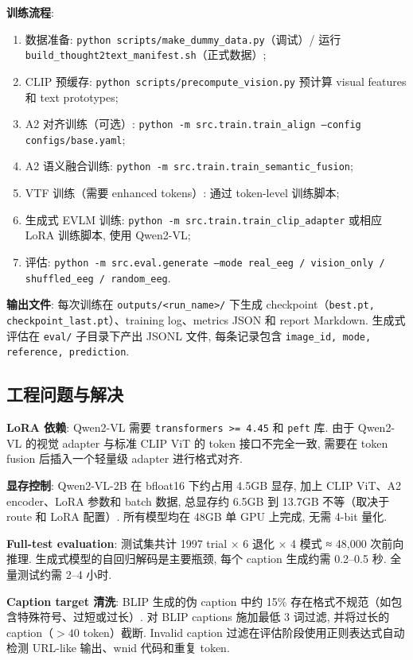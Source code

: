 \textbf{训练流程}:

\begin{enumerate}
  \item 数据准备: \texttt{python scripts/make\_dummy\_data.py}（调试）/ 运行 \texttt{build\_thought2text\_manifest.sh}（正式数据）;
  \item CLIP 预缓存: \texttt{python scripts/precompute\_vision.py} 预计算 visual features 和 text prototypes;
  \item A2 对齐训练（可选）: \texttt{python -m src.train.train\_align --config configs/base.yaml};
  \item A2 语义融合训练: \texttt{python -m src.train.train\_semantic\_fusion};
  \item VTF 训练（需要 enhanced tokens）: 通过 token-level 训练脚本;
  \item 生成式 EVLM 训练: \texttt{python -m src.train.train\_clip\_adapter} 或相应 LoRA 训练脚本, 使用 Qwen2-VL;
  \item 评估: \texttt{python -m src.eval.generate --mode real\_eeg / vision\_only / shuffled\_eeg / random\_eeg}.
\end{enumerate}

\textbf{输出文件}: 每次训练在 \texttt{outputs/<run\_name>/} 下生成 checkpoint（\texttt{best.pt, checkpoint\_last.pt}）、training log、metrics JSON 和 report Markdown. 生成式评估在 \texttt{eval/} 子目录下产出 JSONL 文件, 每条记录包含 \texttt{image\_id, mode, reference, prediction}.

\subsection{工程问题与解决}

\textbf{LoRA 依赖}: Qwen2-VL 需要 \texttt{transformers >= 4.45} 和 \texttt{peft} 库. 由于 Qwen2-VL 的视觉 adapter 与标准 CLIP ViT 的 token 接口不完全一致, 需要在 token fusion 后插入一个轻量级 adapter 进行格式对齐.

\textbf{显存控制}: Qwen2-VL-2B 在 bfloat16 下约占用 4.5GB 显存, 加上 CLIP ViT、A2 encoder、LoRA 参数和 batch 数据, 总显存约 6.5GB 到 13.7GB 不等（取决于 route 和 LoRA 配置）. 所有模型均在 48GB 单 GPU 上完成, 无需 4-bit 量化.

\textbf{Full-test evaluation}: 测试集共计 1997 trial × 6 退化 × 4 模式 ≈ 48,000 次前向推理. 生成式模型的自回归解码是主要瓶颈, 每个 caption 生成约需 0.2--0.5 秒. 全量测试约需 2--4 小时.

\textbf{Caption target 清洗}: BLIP 生成的伪 caption 中约 15\% 存在格式不规范（如包含特殊符号、过短或过长）. 对 BLIP captions 施加最低 3 词过滤, 并将过长的 caption（$>40$ token）截断. Invalid caption 过滤在评估阶段使用正则表达式自动检测 URL-like 输出、wnid 代码和重复 token.
